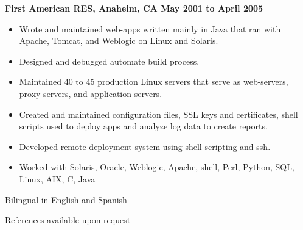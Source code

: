 \documentclass{res}
\begin{document}
\begin{resume}
{\large \bf First American RES, Anaheim, CA \hfill May 2001 to April 2005}
\begin{itemize}
\item Wrote and maintained web-apps written mainly in Java that ran
with Apache, Tomcat, and Weblogic on Linux and Solaris.
\item Designed and debugged automate build process.
\item Maintained 40 to 45 production Linux servers that serve as
web-servers, proxy servers, and application servers.
\item Created and maintained configuration files,
SSL keys and certificates, shell scripts used to deploy apps and
analyze log data to create reports.
\item Developed remote deployment system using shell scripting and
ssh.
\item  Worked with Solaris, Oracle, Weblogic, Apache, shell, Perl, Python,
SQL, Linux, AIX, C, Java
\end{itemize}


Bilingual in English and Spanish

References available upon request

\end{resume}
\end{document}
